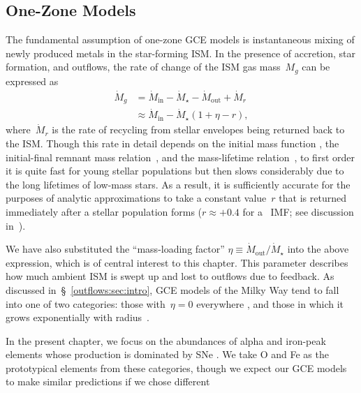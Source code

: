 \subsection{One-Zone Models}
\label{outflows:sec:gce:onezone}
The fundamental assumption of one-zone GCE models is instantaneous
mixing of newly produced metals in the star-forming ISM.
In the presence of accretion, star formation, and outflows, the rate of
change of the ISM gas mass~$M_g$ can be expressed as
\begin{equation}\begin{split}
\dot{M}_g &= \dot{M}_\text{in} - \dot{M}_\star - \dot{M}_\text{out} +
\dot{M}_r
\\
&\approx \dot{M}_\text{in} - \dot{M}_\star(1 + \eta - r),
\label{outflows:eq:mdot-gas-noflow}
\end{split}\end{equation}
where~$\dot{M}_r$ is the rate of recycling from stellar envelopes being
returned back to the ISM.
Though this rate in detail depends on the initial mass function
\citep[IMF; e.g.,][]{Salpeter1955, Kroupa2001, Chabrier2003}, the
initial-final remnant mass relation~\citep[e.g.,][]{Kalirai2008}, and the
mass-lifetime relation~\citep[e.g.,][]{Larson1974, Maeder1989, Hurley2000},
to first order it is quite fast for young stellar populations but then
slows considerably due to the long lifetimes of low-mass stars.
As a result, it is sufficiently accurate for the purposes of analytic
approximations to take a constant value~$r$ that is returned immediately
after a stellar population forms ($r \approx +0.4$ for
a~\citealt{Kroupa2001} IMF; see discussion in~\citealt{Weinberg2017b}).
\par
We have also substituted the ``mass-loading factor''
$\eta \equiv \dot{M}_\text{out} / \dot{M}_\star$ into the above expression,
which is of central interest to this chapter.
This parameter describes how much ambient ISM is swept up and lost to outflows
due to feedback.
As discussed in~\S~\ref{outflows:sec:intro}, GCE models of the Milky Way
tend to fall into one of two categories: those with~$\eta = 0$ everywhere
\citep[e.g.,][]{Spitoni2021}, and those in which it grows exponentially
with radius~\citep[e.g.,][]{Johnson2021}.
\par
In the present chapter, we focus on the abundances of alpha and
iron-peak elements whose production is dominated by SNe
\citep[e.g.,][]{Johnson2019}.
We take O and Fe as the prototypical elements from these categories, though
we expect our GCE models to make similar predictions if we chose different
